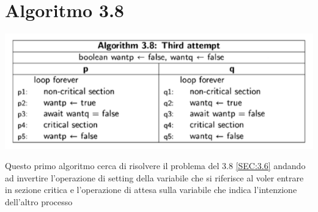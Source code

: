 \documentclass[a4paper]{article}
\begin{document}
\newpage
\section{Algoritmo 3.8}
\label{SEC:3.8}
\begin{center}\includegraphics[width=1\textwidth]{3.8.png}\end{center}
Questo primo algoritmo cerca di risolvere il problema del 3.8 \ref{SEC:3.6} andando ad invertire l'operazione di setting della variabile che si riferisce al voler entrare in sezione critica e l'operazione di attesa sulla variabile che indica l'intenzione dell'altro processo
\end{document}

